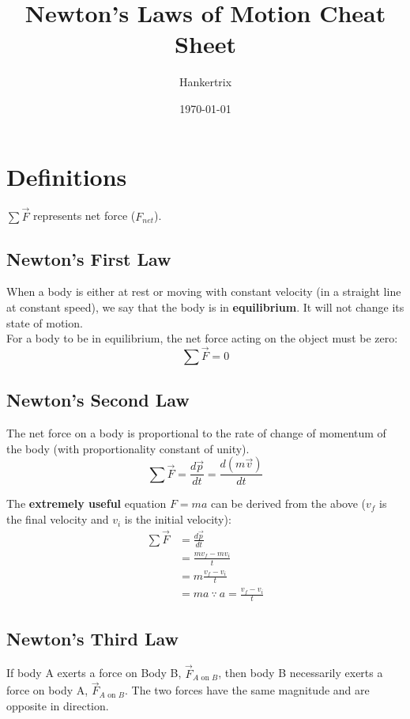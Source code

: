 \documentclass[11pt]{article}
\author{Hankertrix}
\date{\today}
\title{Newton's Laws of Motion Cheat Sheet}
\begin{document}
\maketitle
\setcounter{tocdepth}{2}
\tableofcontents

\newpage

\section{Definitions}
\label{sec:orga5e9283}

\(\sum \vec{F}\) represents net force (\(F_{net}\)).

\subsection{Newton's First Law}
\label{sec:org7824a29}
When a body is either at rest or moving with constant velocity (in a straight line at constant speed), we say that the body is in \textbf{equilibrium}. It will not change its state of motion.
\\[0pt]

For a body to be in equilibrium, the net force acting on the object must be zero:
\[\sum \vec{F} = 0\]

\subsection{Newton's Second Law}
\label{sec:org73e5c1c}
The net force on a body is proportional to the rate of change of momentum of the body (with proportionality constant of unity).
\[\sum \vec{F} = \frac{d \vec{p}}{dt} = \frac{d(m \vec{v})}{dt}\]

The \textbf{extremely useful} equation \(F = ma\) can be derived from the above (\(v_f\) is the final velocity and \(v_i\) is the initial velocity):
\begin{align*}
\sum \vec{F} &= \frac{d \vec{p}}{dt} \\
&= \frac{mv_f - mv_i}{t} \\
&= m \frac{v_f - v_i}{t} \\
&= ma \ \because \ a = \frac{v_f - v_i}{t}
\end{align*}

\subsection{Newton's Third Law}
\label{sec:org8aa3b3f}
If body A exerts a force on Body B, \(\vec{F}_{A \text{ on } B}\), then body B necessarily exerts a force on body A, \(\vec{F}_{A \text{ on } B}\). The two forces have the same magnitude and are opposite in direction.
\\[0pt]
\end{document}
